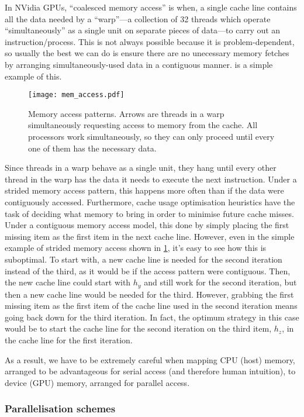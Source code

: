 In NVidia GPUs, ``coalesced memory access'' is when, a single cache line contains all the data needed by a ``warp''---a collection of 32 threads which operate ``simultaneously'' as a single unit on separate pieces of data---to carry out an instruction/process. This is not always possible because it is problem-dependent, so usually the best we can do is ensure there are no unecessary memory fetches by arranging simultaneously-used data in a contiguous manner.  is a simple example of this.
\begin{figure}
    \centering
    \texttt{[image: mem\_access.pdf]}
    \caption[Memory access patterns.]{Memory access patterns. Arrows are threads in a warp simultaneously requesting access to memory from the cache. All processors work simultaneously, so they can only proceed until every one of them has the necessary data.}
    \label{f:mem_access}
\end{figure}

Since threads in a warp behave as a single unit, they hang until every other thread in the warp has the data it needs to execute the next instruction. Under a strided memory access pattern, this happens more often than if the data were contiguously accessed. Furthermore, cache usage optimisation heuristics have the task of deciding what memory to bring in order to minimise future cache misses. Under a contiguous memory access model, this done by simply placing the first missing item as the first item in the next cache line. However, even in the simple example of strided memory access shown in \cref{f:mem_access}, it's easy to see how this is suboptimal. To start with, a new cache line is needed for the second iteration instead of the third, as it would be if the access pattern were contiguous. Then, the new cache line could start with $h_y$ and still work for the second iteration, but then a new cache line would be needed for the third. However, grabbing the first missing item as the first item of the cache line used in the second iteration means going back down for the third iteration. In fact, the optimum strategy in this case would be to start the cache line for the second iteration on the third item, $h_z$, in the cache line for the first iteration.

As a result, we have to be extremely careful when mapping CPU (host) memory, arranged to be advantageous for serial access (and therefore human intuition), to device (GPU) memory, arranged for parallel access.

\subsubsection{Parallelisation schemes}

